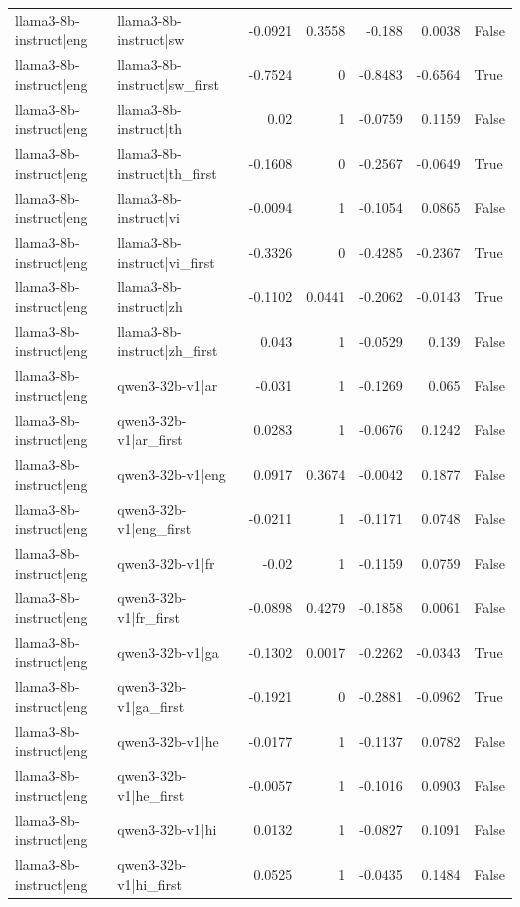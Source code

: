 \begin{table}
\begin{tabular}{l l r r r r l}
llama3-8b-instruct|eng & llama3-8b-instruct|sw & -0.0921 & 0.3558 & -0.188 & 0.0038 & False \\
llama3-8b-instruct|eng & llama3-8b-instruct|sw_first & -0.7524 & 0 & -0.8483 & -0.6564 & True \\
llama3-8b-instruct|eng & llama3-8b-instruct|th & 0.02 & 1 & -0.0759 & 0.1159 & False \\
llama3-8b-instruct|eng & llama3-8b-instruct|th_first & -0.1608 & 0 & -0.2567 & -0.0649 & True \\
llama3-8b-instruct|eng & llama3-8b-instruct|vi & -0.0094 & 1 & -0.1054 & 0.0865 & False \\
llama3-8b-instruct|eng & llama3-8b-instruct|vi_first & -0.3326 & 0 & -0.4285 & -0.2367 & True \\
llama3-8b-instruct|eng & llama3-8b-instruct|zh & -0.1102 & 0.0441 & -0.2062 & -0.0143 & True \\
llama3-8b-instruct|eng & llama3-8b-instruct|zh_first & 0.043 & 1 & -0.0529 & 0.139 & False \\
llama3-8b-instruct|eng & qwen3-32b-v1|ar & -0.031 & 1 & -0.1269 & 0.065 & False \\
llama3-8b-instruct|eng & qwen3-32b-v1|ar_first & 0.0283 & 1 & -0.0676 & 0.1242 & False \\
llama3-8b-instruct|eng & qwen3-32b-v1|eng & 0.0917 & 0.3674 & -0.0042 & 0.1877 & False \\
llama3-8b-instruct|eng & qwen3-32b-v1|eng_first & -0.0211 & 1 & -0.1171 & 0.0748 & False \\
llama3-8b-instruct|eng & qwen3-32b-v1|fr & -0.02 & 1 & -0.1159 & 0.0759 & False \\
llama3-8b-instruct|eng & qwen3-32b-v1|fr_first & -0.0898 & 0.4279 & -0.1858 & 0.0061 & False \\
llama3-8b-instruct|eng & qwen3-32b-v1|ga & -0.1302 & 0.0017 & -0.2262 & -0.0343 & True \\
llama3-8b-instruct|eng & qwen3-32b-v1|ga_first & -0.1921 & 0 & -0.2881 & -0.0962 & True \\
llama3-8b-instruct|eng & qwen3-32b-v1|he & -0.0177 & 1 & -0.1137 & 0.0782 & False \\
llama3-8b-instruct|eng & qwen3-32b-v1|he_first & -0.0057 & 1 & -0.1016 & 0.0903 & False \\
llama3-8b-instruct|eng & qwen3-32b-v1|hi & 0.0132 & 1 & -0.0827 & 0.1091 & False \\
llama3-8b-instruct|eng & qwen3-32b-v1|hi_first & 0.0525 & 1 & -0.0435 & 0.1484 & False \\

\end{tabular}
\end{table}
